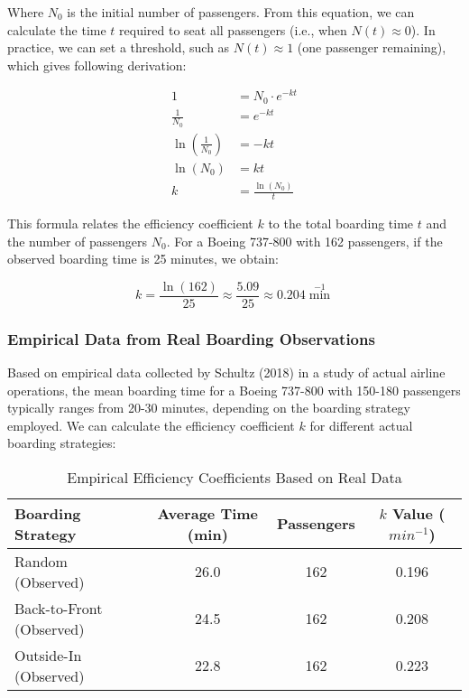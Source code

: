 \documentclass[12pt]{article}
\begin{document}
Where $N_0$ is the initial number of passengers. From this equation, we can calculate the time $t$ required to seat all passengers (i.e., when $N(t) \approx 0$). In practice, we can set a threshold, such as $N(t) \approx 1$ (one passenger remaining), which gives following derivation:

\begin{align}
1 &= N_0 \cdot e^{-kt} \\
\frac{1}{N_0} &= e^{-kt} \\
\ln\left(\frac{1}{N_0}\right) &= -kt \\
\ln(N_0) &= kt \\
k &= \frac{\ln(N_0)}{t}
\end{align}

This formula relates the efficiency coefficient $k$ to the total boarding time $t$ and the number of passengers $N_0$. For a Boeing 737-800 with 162 passengers, if the observed boarding time is 25 minutes, we obtain:

\begin{equation}
k = \frac{\ln(162)}{25} \approx \frac{5.09}{25} \approx 0.204 \min^{-1}
\end{equation}

\subsubsection{Empirical Data from Real Boarding Observations}

Based on empirical data collected by Schultz (2018) in a study of actual airline operations, the mean boarding time for a Boeing 737-800 with 150-180 passengers typically ranges from 20-30 minutes, depending on the boarding strategy employed. We can calculate the efficiency coefficient $k$ for different actual boarding strategies:

\begin{table}[H]
\centering
\caption{Empirical Efficiency Coefficients Based on Real Data}
\begin{tabular}{lccc}
\toprule
\textbf{Boarding Strategy} & \textbf{Average Time (min)} & \textbf{Passengers} & \textbf{$k$ Value ($min^{-1}$)} \\
\midrule
Random (Observed) & 26.0 & 162 & 0.196 \\
Back-to-Front (Observed) & 24.5 & 162 & 0.208 \\
Outside-In (Observed) & 22.8 & 162 & 0.223 \\
\bottomrule
\end{tabular}
\end{table}
\end{document}
